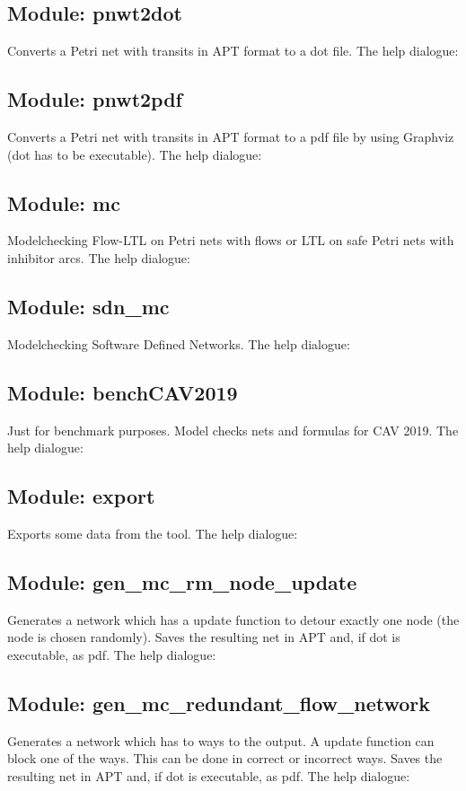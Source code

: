 \subsection*{Module: pnwt2dot}
Converts a Petri net with transits in APT format to a dot file. The help dialogue: 

\subsection*{Module: pnwt2pdf}
Converts a Petri net with transits in APT format to a pdf file by using Graphviz (dot has to be executable). The help dialogue: 

\subsection*{Module: mc}
Modelchecking Flow-LTL on Petri nets with flows or LTL on safe Petri nets with inhibitor arcs. The help dialogue: 

\subsection*{Module: sdn\_mc}
Modelchecking Software Defined Networks. The help dialogue: 

\subsection*{Module: benchCAV2019}
Just for benchmark purposes. Model checks nets and formulas for CAV 2019. The help dialogue: 

\subsection*{Module: export}
Exports some data from the tool. The help dialogue: 

\subsection*{Module: gen\_mc\_rm\_node\_update}
Generates a network which has a update function to detour exactly one node (the node is chosen randomly). Saves the resulting net in APT and, if dot is executable, as pdf. The help dialogue: 

\subsection*{Module: gen\_mc\_redundant\_flow\_network}
Generates a network which has to ways to the output. A update function can block one of the ways. This can be done in correct or incorrect ways. Saves the resulting net in APT and, if dot is executable, as pdf. The help dialogue: 

